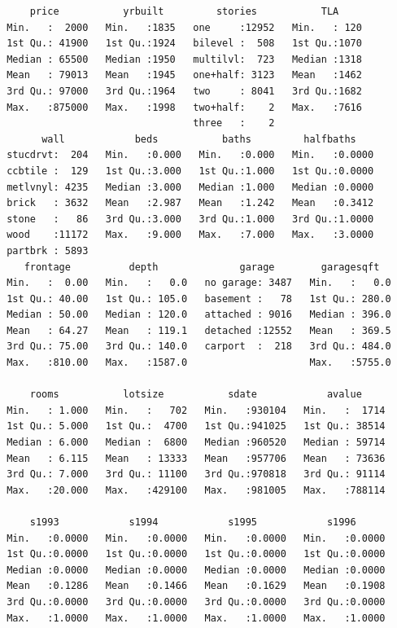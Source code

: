 \documentclass[
  norsk,
  a4paper,
]{article}
\begin{document}
\begin{verbatim}
     price           yrbuilt         stories           TLA      
 Min.   :  2000   Min.   :1835   one     :12952   Min.   : 120  
 1st Qu.: 41900   1st Qu.:1924   bilevel :  508   1st Qu.:1070  
 Median : 65500   Median :1950   multilvl:  723   Median :1318  
 Mean   : 79013   Mean   :1945   one+half: 3123   Mean   :1462  
 3rd Qu.: 97000   3rd Qu.:1964   two     : 8041   3rd Qu.:1682  
 Max.   :875000   Max.   :1998   two+half:    2   Max.   :7616  
                                 three   :    2                 
       wall            beds           baths         halfbaths     
 stucdrvt:  204   Min.   :0.000   Min.   :0.000   Min.   :0.0000  
 ccbtile :  129   1st Qu.:3.000   1st Qu.:1.000   1st Qu.:0.0000  
 metlvnyl: 4235   Median :3.000   Median :1.000   Median :0.0000  
 brick   : 3632   Mean   :2.987   Mean   :1.242   Mean   :0.3412  
 stone   :   86   3rd Qu.:3.000   3rd Qu.:1.000   3rd Qu.:1.0000  
 wood    :11172   Max.   :9.000   Max.   :7.000   Max.   :3.0000  
 partbrk : 5893                                                   
    frontage          depth              garage        garagesqft    
 Min.   :  0.00   Min.   :   0.0   no garage: 3487   Min.   :   0.0  
 1st Qu.: 40.00   1st Qu.: 105.0   basement :   78   1st Qu.: 280.0  
 Median : 50.00   Median : 120.0   attached : 9016   Median : 396.0  
 Mean   : 64.27   Mean   : 119.1   detached :12552   Mean   : 369.5  
 3rd Qu.: 75.00   3rd Qu.: 140.0   carport  :  218   3rd Qu.: 484.0  
 Max.   :810.00   Max.   :1587.0                     Max.   :5755.0  
                                                                     
     rooms           lotsize           sdate            avalue      
 Min.   : 1.000   Min.   :   702   Min.   :930104   Min.   :  1714  
 1st Qu.: 5.000   1st Qu.:  4700   1st Qu.:941025   1st Qu.: 38514  
 Median : 6.000   Median :  6800   Median :960520   Median : 59714  
 Mean   : 6.115   Mean   : 13333   Mean   :957706   Mean   : 73636  
 3rd Qu.: 7.000   3rd Qu.: 11100   3rd Qu.:970818   3rd Qu.: 91114  
 Max.   :20.000   Max.   :429100   Max.   :981005   Max.   :788114  
                                                                    
     s1993            s1994            s1995            s1996       
 Min.   :0.0000   Min.   :0.0000   Min.   :0.0000   Min.   :0.0000  
 1st Qu.:0.0000   1st Qu.:0.0000   1st Qu.:0.0000   1st Qu.:0.0000  
 Median :0.0000   Median :0.0000   Median :0.0000   Median :0.0000  
 Mean   :0.1286   Mean   :0.1466   Mean   :0.1629   Mean   :0.1908  
 3rd Qu.:0.0000   3rd Qu.:0.0000   3rd Qu.:0.0000   3rd Qu.:0.0000  
 Max.   :1.0000   Max.   :1.0000   Max.   :1.0000   Max.   :1.0000  
                                                                    

\end{verbatim}
\end{document}
